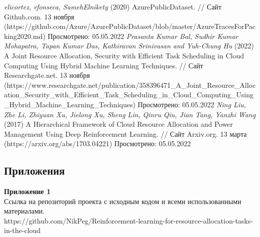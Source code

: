 \documentclass{article}
\newcommand\zz[1]{\par{\normalsize\strut #1} \hfill\ignorespaces}
\begin{document}
\begin{center}
\begin{thebibliography}{}
 \textit{elicortez, rfonseca, SamehElnikety} (2020) AzurePublicDataset. // Сайт Github.com. 13 ноября (https://github.com/Azure/AzurePublicDataset/blob/master/AzureTracesForPacking2020.md) Просмотрено: 05.05.2022
 \textit{Prasanta Kumar Bal, Sudhir Kumar Mohapatra, Tapan Kumar Das, Kathiravan Srinivasan and Yuh-Chung Hu} (2022) A Joint Resource Allocation, Security with Efficient Task Scheduling in Cloud Computing Using Hybrid Machine Learning Techniques. // Сайт Researchgate.net. 13 ноября (https://www.researchgate.net/publication/358396471\_A\_Joint\_Resource\_Allocation\_Security\_with\_Efficient\_Task\_Scheduling\_in\_Cloud\_Computing\_Using\_Hybrid\_Machine\_Learning\_Techniques) Просмотрено: 05.05.2022
 \textit{Ning Liu, Zhe Li, Zhiyuan Xu, Jielong Xu, Sheng Lin, Qinru Qiu, Jian Tang, Yanzhi Wang} (2017) A Hierarchical Framework of Cloud Resource Allocation and Power Management Using Deep Reinforcement Learning. // Сайт Arxiv.org. 13 марта (https://arxiv.org/abs/1703.04221) Просмотрено: 05.05.2022
\end{thebibliography}
\end{center}
\newpage
\begin{center}
\section {Приложения}
\end{center}
\zz{}\textbf{Приложение 1\\}
Ссылка на репозиторий проекта с исходным кодом и всеми использованными материалами.\\
https://github.com/NikPeg/Reinforcement-learning-for-resource-allocation-tasks-in-the-cloud
\end{document}
